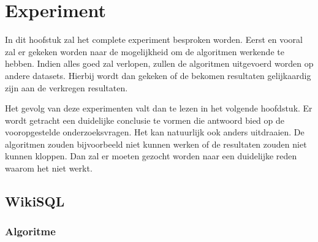 
\chapter{Experiment}
\label{ch:experiment}

In dit hoofstuk zal het complete experiment besproken worden. Eerst en vooral zal er gekeken worden naar de mogelijkheid om de algoritmen werkende te hebben. Indien alles goed zal verlopen, zullen de algoritmen uitgevoerd worden op andere datasets. Hierbij wordt dan gekeken of de bekomen resultaten gelijkaardig zijn aan de verkregen resultaten. 

Het gevolg van deze experimenten valt dan te lezen in het volgende hoofdstuk. Er wordt getracht een duidelijke conclusie te vormen die antwoord bied op de vooropgestelde onderzoeksvragen. Het kan natuurlijk ook anders uitdraaien. De algoritmen zouden bijvoorbeeld niet kunnen werken of de resultaten zouden niet kunnen kloppen. Dan zal er moeten gezocht worden naar een duidelijke reden waarom het niet werkt.

\textbf{}

\section{WikiSQL}

\subsection{Algoritme}

